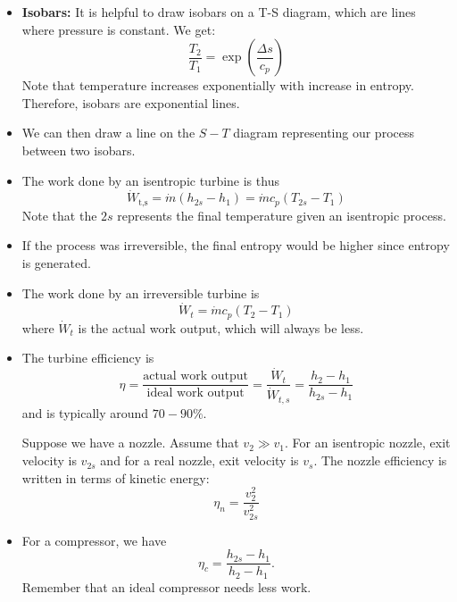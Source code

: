 \begin{itemize}
    \item \textbf{Isobars:} It is helpful to draw isobars on a T-S diagram, which are lines where pressure is constant. We get: 
    \begin{equation}
        \frac{T_2}{T_1} = \exp\left(\frac{\Delta s}{c_p}\right)
    \end{equation}
    Note that temperature increases exponentially with increase in entropy. Therefore, isobars are exponential lines.
    \item We can then draw a line on the $S-T$ diagram representing our process between two isobars. 
    \item The work done by an isentropic turbine is thus 
    \begin{equation}
        \dot{W}_\text{t,s} = \dot{m}(h_{2s}-h_1) = \dot{m}c_p(T_{2s}-T_1)
    \end{equation}
    Note that the $2s$ represents the final temperature given an isentropic process.
    \item If the process was irreversible, the final entropy would be higher since entropy is generated. 
    \item The work done by an irreversible turbine is
    \begin{equation}
        \dot{W}_t = \dot{m}c_p(T_2-T_1)
    \end{equation}
    where $\dot{W}_t$ is the actual work output, which will always be less.
    \item The turbine efficiency is
    \begin{equation}
        \eta = \frac{\text{actual work output}}{\text{ideal work output}} = \frac{\dot{W}_t}{\dot{W}_{t,s}}=\frac{h_2-h_1}{h_{2s}-h_1}
    \end{equation}
    and is typically around $70-90\%$.
    \begin{example}
        Suppose we have a nozzle. Assume that $v_2 \gg v_1$. For an isentropic nozzle, exit velocity is $v_{2s}$ and for a real nozzle, exit velocity is $v_s$.  The nozzle efficiency is written in terms of kinetic energy: 
        \begin{equation}
            \eta_n = \frac{v_2^2}{v_{2s}^2}
        \end{equation}
    \end{example}
    \item For a compressor, we have 
    \begin{equation}
        \eta_c = \frac{h_{2s}-h_1}{h_2-h_1}.
    \end{equation}
    Remember that an ideal compressor needs less work.

\end{itemize}
